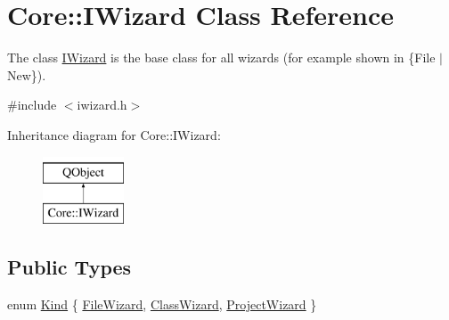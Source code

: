 \hypertarget{class_core_1_1_i_wizard}{\section{Core\-:\-:I\-Wizard Class Reference}
\label{class_core_1_1_i_wizard}
}


The class \hyperlink{class_core_1_1_i_wizard}{I\-Wizard} is the base class for all wizards (for example shown in  \{File $|$ New\}).  




{\ttfamily \#include $<$iwizard.\-h$>$}

Inheritance diagram for Core\-:\-:I\-Wizard\-:\begin{figure}[H]
\begin{center}
\leavevmode
\includegraphics[height=2.000000cm]{class_core_1_1_i_wizard}
\end{center}
\end{figure}
\subsection*{Public Types}
\begin{DoxyCompactItemize}
\item 
enum \hyperlink{group___core_plugin_ga90d21d8ad72cb14ddb8486fdff7b51f4}{Kind} \{ \hyperlink{group___core_plugin_gga90d21d8ad72cb14ddb8486fdff7b51f4aa24018418bb2ddf6c02d2b792c5fabe8}{File\-Wizard}, 
\hyperlink{group___core_plugin_gga90d21d8ad72cb14ddb8486fdff7b51f4ab0cb08b20b12fbf556268c165353035a}{Class\-Wizard}, 
\hyperlink{group___core_plugin_gga90d21d8ad72cb14ddb8486fdff7b51f4a458498ed994138c90140befda7a20b58}{Project\-Wizard}
 \}
\end{DoxyCompactItemize}
